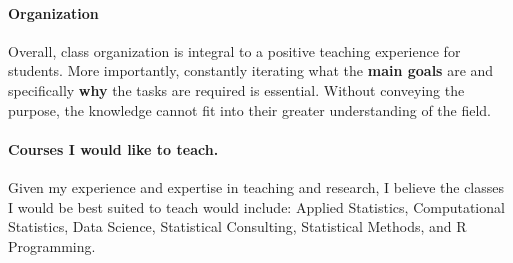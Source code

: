 \documentclass[12pt,a4paper]{article}
\begin{document}
\vspace{-1em}
\paragraph{Organization} Overall, class organization is integral to a positive teaching experience for students.  More importantly, constantly iterating what the {\bf main goals} are and specifically {\bf why} the tasks are required is essential.  Without conveying the purpose, the knowledge cannot fit into their greater understanding of the field.

\vspace{-1em}
\paragraph{Courses I would like to teach.} Given my experience and expertise in teaching and research, I believe the classes I would be best suited to teach would include: Applied Statistics, Computational Statistics, Data Science, Statistical Consulting, Statistical Methods, and R Programming.  
\end{document}

